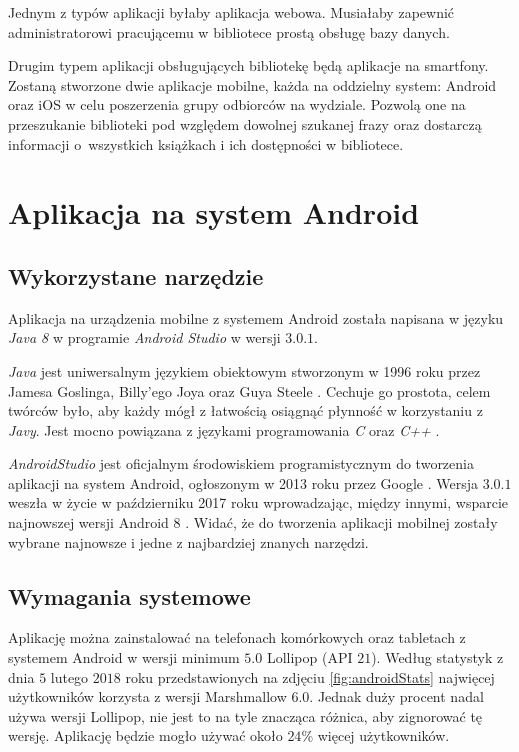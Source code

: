 \documentclass[twoside]{projektInzynierskiMS}
\begin{document}
Jednym z typów aplikacji byłaby aplikacja webowa. Musiałaby zapewnić administratorowi pracującemu w bibliotece prostą obsługę bazy danych.

Drugim typem aplikacji obsługujących bibliotekę będą aplikacje na smartfony. Zostaną stworzone dwie aplikacje mobilne, każda na oddzielny system: Android oraz iOS w celu poszerzenia grupy odbiorców na wydziale. Pozwolą one na przeszukanie biblioteki pod względem dowolnej szukanej frazy oraz dostarczą informacji o~wszystkich książkach i ich dostępności w bibliotece.

\section{Aplikacja na system Android}

\subsection{Wykorzystane narzędzie}

Aplikacja na urządzenia mobilne z systemem Android została napisana w języku \textit{Java 8} w programie \textit{Android Studio} w wersji $3.0.1$.

\textit{Java} jest uniwersalnym językiem obiektowym stworzonym w 1996 roku przez Jamesa Goslinga, Billy'ego Joya oraz Guya Steele \cite{javaOracle}. Cechuje go prostota, celem twórców było, aby każdy mógł z łatwością osiągnąć płynność w korzystaniu z \textit{Javy}. Jest mocno powiązana z językami programowania \textit{C} oraz \textit{C++} \cite{javaOracle}. 

\textit{AndroidStudio} jest oficjalnym środowiskiem programistycznym do tworzenia aplikacji na system Android, ogłoszonym w 2013 roku przez Google \cite{PPPAndroida}. Wersja $3.0.1$ weszła w życie w październiku 2017 roku wprowadzając, między innymi, wsparcie najnowszej wersji Android $8$ \cite{androidStudioDev}. Widać, że do tworzenia aplikacji mobilnej zostały wybrane najnowsze i jedne z najbardziej znanych narzędzi.
 
\subsection{Wymagania systemowe}

Aplikację można zainstalować na telefonach komórkowych oraz tabletach z systemem Android w wersji minimum $5.0$ Lollipop (API $21$). Według statystyk z dnia $5$ lutego $2018$ roku \cite{androidStatistics} przedstawionych na zdjęciu \ref{fig:androidStats} najwięcej użytkowników korzysta z wersji Marshmallow $6.0$. Jednak duży procent nadal używa wersji Lollipop, nie jest to na tyle znacząca różnica, aby zignorować tę wersję. Aplikację będzie mogło używać około $24\%$ więcej użytkowników.    
\end{document}
